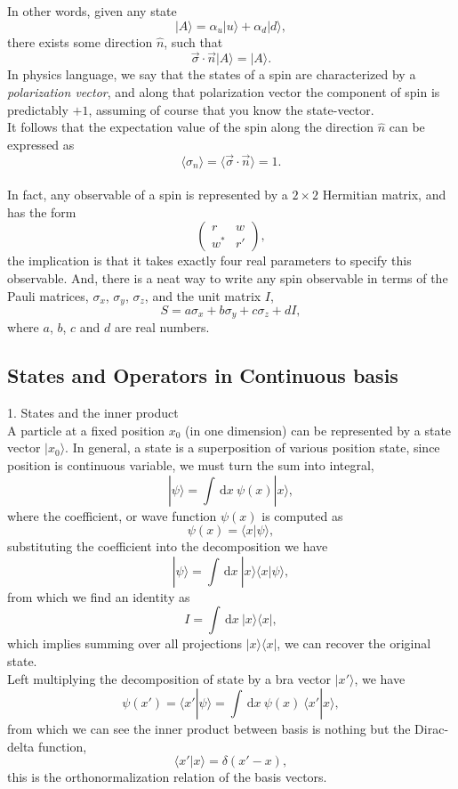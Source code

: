 \documentclass{article}
\newcommand{\be}{\begin{equation}}
\newcommand{\ee}{\end{equation}}
\newcommand{\ba}{\begin{array}}
\newcommand{\ea}{\end{array}}
\newcommand{\dif}{\,\mathrm{d}}
\newcommand{\1}{\left}
\newcommand{\2}{\right}
\newcommand{\la}{\langle}
\newcommand{\ra}{\rangle}
\newcommand{\al}{\alpha}
\newcommand{\sig}{\sigma}
\begin{document}
In other words, given any state
\be
|A\ra=\al_u|u\ra+\al_d|d\ra,
\ee
there exists some direction $\hat n$, such that
\be
\vec\sig\cdot\vec n|A\ra= |A\ra.
\ee
In physics language, we say that the states of a spin are characterized by a \textit{polarization vector}, and along that polarization vector the component of spin is predictably $+1$, assuming of course that you know the state-vector.\\ It follows that the expectation value of the spin along the direction $\hat n$ can be expressed as
\be
\la\sig_n\ra=\la \vec\sig\cdot\vec n\ra=1.
\ee\\

In fact, any observable of a spin is represented by a $2\times2$ Hermitian matrix, and has the form
\be
\1(\ba{cc}r&w\\w^*&r'\ea\2),
\ee
the implication is that it takes exactly four real parameters to specify this observable. And, there is a neat way to write any spin observable in terms of the Pauli matrices, $\sig_x$, $\sig_y$, $\sig_z$, and the unit matrix $I$,
\be S=a\sig_x+b\sig_y+c\sig_z+d I, \ee
where $a$, $b$, $c$ and $d$ are real numbers.

\subsection{States and Operators in Continuous basis}
1. States and the inner product\\

A particle at a fixed position $x_0$ (in one dimension) can be represented by a state vector $|x_0\ra$. In general, a state is a superposition of various position state, since position is continuous variable, we must turn the sum into integral,
\be
|\psi\ra=\int \dif x \ \psi(x)|x\ra,
\ee
where the coefficient, or wave function $\psi(x)$ is computed as
\be
\psi(x)=\la x|\psi\ra,
\ee
substituting the coefficient into the decomposition we have
\be
|\psi\ra=\int \dif x \ |x\ra \la x|\psi\ra,
\ee
from which we find an identity as
\be
I=\int \dif x \ |x\ra \la x|,
\ee
which implies summing over all projections $|x\ra \la x|$, we can recover the original state.\\
Left multiplying the decomposition of state by a bra vector $|x'\ra$, we have
\be
\psi(x')=\la x'|\psi\ra=\int \dif x \ \psi(x)\ \la x'|x\ra,
\ee
from which we can see the inner product between basis is nothing but the Dirac-delta function,
\be
\la x'|x\ra=\delta(x'-x),
\ee
this is the orthonormalization relation of the basis vectors.\\
\end{document}
